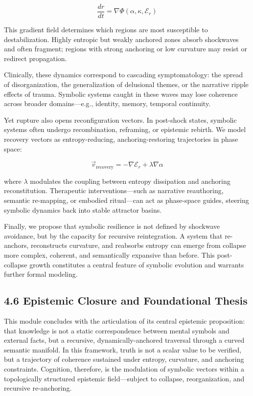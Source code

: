 \[
\frac{dr}{dt} = \nabla \Phi(\alpha, \kappa, \mathcal{E}_r)
\]

This gradient field determines which regions are most susceptible to destabilization. Highly entropic but weakly anchored zones absorb shockwaves and often fragment; regions with strong anchoring or low curvature may resist or redirect propagation.

Clinically, these dynamics correspond to cascading symptomatology: the spread of disorganization, the generalization of delusional themes, or the narrative ripple effects of trauma. Symbolic systems caught in these waves may lose coherence across broader domains—e.g., identity, memory, temporal continuity.

Yet rupture also opens reconfiguration vectors. In post-shock states, symbolic systems often undergo recombination, reframing, or epistemic rebirth. We model recovery vectors as entropy-reducing, anchoring-restoring trajectories in phase space:

\[
\vec{v}_{\text{recovery}} = -\nabla \mathcal{E}_r + \lambda \nabla \alpha
\]

where $\lambda$ modulates the coupling between entropy dissipation and anchoring reconstitution. Therapeutic interventions—such as narrative reauthoring, semantic re-mapping, or embodied ritual—can act as phase-space guides, steering symbolic dynamics back into stable attractor basins.

Finally, we propose that symbolic resilience is not defined by shockwave avoidance, but by the capacity for recursive reintegration. A system that re-anchors, reconstructs curvature, and reabsorbs entropy can emerge from collapse more complex, coherent, and semantically expansive than before. This post-collapse growth constitutes a central feature of symbolic evolution and warrants further formal modeling.



\subsection*{4.6 Epistemic Closure and Foundational Thesis}

This module concludes with the articulation of its central epistemic proposition: that knowledge is not a static correspondence between mental symbols and external facts, but a recursive, dynamically-anchored traversal through a curved semantic manifold. In this framework, truth is not a scalar value to be verified, but a trajectory of coherence sustained under entropy, curvature, and anchoring constraints. Cognition, therefore, is the modulation of symbolic vectors within a topologically structured epistemic field—subject to collapse, reorganization, and recursive re-anchoring.


